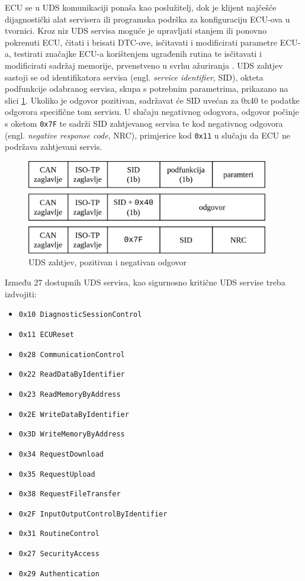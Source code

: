 \documentclass[times, utf8, diplomski, numeric]{fer}
\begin{document}
ECU se u UDS komunikaciji ponaša kao poslužitelj, dok je klijent najčešće dijagnostički alat servisera ili programska podrška za konfiguraciju ECU-ova u tvornici. Kroz niz UDS servisa moguće je upravljati stanjem ili ponovno pokrenuti ECU, čitati i brisati DTC-ove, isčitavati i modificirati parametre ECU-a, testirati značajke ECU-a korištenjem ugrađenih rutina te isčitavati i modificirati sadržaj memorije, prvenstveno u svrhu ažuriranja \cite{falch2022uds}. UDS zahtjev sastoji se od identifikatora servisa (engl. \textit{service identifier}, SID), okteta podfunkcije odabranog servisa, skupa s potrebnim parametrima, prikazano na slici \ref{fig:uds}. Ukoliko je odgovor pozitivan, sadržavat će SID uvećan za 0x40 te podatke odgovora specifične tom servisu. U slučaju negativnog odogvora, odgovor počinje s oketom \texttt{0x7F} te sadrži SID zahtjevanog servisa te kod negativnog odgovora (engl. \textit{negative response code}, NRC), primjerice kod \texttt{0x11} u slučaju da ECU ne podržava zahtjevani servis. 

\bigskip
\begin{figure}[htb]
\centering
\includegraphics[width=300pt]{slike/uds.png}
\caption{UDS zahtjev, pozitivan i negativan odgovor}
\label{fig:uds}
\end{figure}

\newpage
Između 27 dostupnih UDS servisa, kao sigurnosno kritične UDS servise treba izdvojiti:
\begin{itemize}
    \item \texttt{0x10 DiagnosticSessionControl}
    \item \texttt{0x11 ECUReset}
    \item \texttt{0x28 CommunicationControl}
    \bigskip
    \item \texttt{0x22 ReadDataByIdentifier}
    \item \texttt{0x23 ReadMemoryByAddress}
    \item \texttt{0x2E WriteDataByIdentifier}
    \item \texttt{0x3D WriteMemoryByAddress}
    \bigskip
    \item \texttt{0x34 RequestDownload}
    \item \texttt{0x35 RequestUpload}
    \item \texttt{0x38 RequestFileTransfer}
    \bigskip
    \item \texttt{0x2F InputOutputControlByIdentifier}
    \item \texttt{0x31 RoutineControl}
    \bigskip
    \item \texttt{0x27 SecurityAccess}
    \item \texttt{0x29 Authentication}
\end{itemize}
\end{document}
